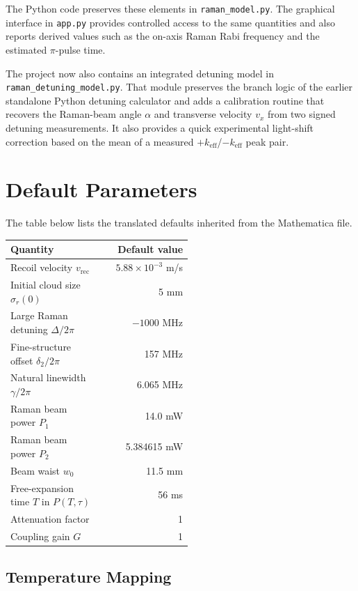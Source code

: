 \documentclass[11pt,a4paper]{article}
\begin{document}
The Python code preserves these elements in \texttt{raman\_model.py}. The graphical interface in
\texttt{app.py} provides controlled access to the same quantities and also reports derived values
such as the on-axis Raman Rabi frequency and the estimated $\pi$-pulse time.

The project now also contains an integrated detuning model in \texttt{raman\_detuning\_model.py}.
That module preserves the branch logic of the earlier standalone Python detuning calculator and
adds a calibration routine that recovers the Raman-beam angle $\alpha$ and transverse velocity
$v_x$ from two signed detuning measurements. It also provides a quick experimental light-shift
correction based on the mean of a measured $+k_{\mathrm{eff}}$/$-k_{\mathrm{eff}}$ peak pair.

\section{Default Parameters}

The table below lists the translated defaults inherited from the Mathematica file.

\begin{center}
\begin{tabular}{>{\raggedright\arraybackslash}p{0.52\linewidth}r}
\toprule
Quantity & Default value \\
\midrule
Recoil velocity $v_{\mathrm{rec}}$ & $5.88 \times 10^{-3}$ m/s \\
Initial cloud size $\sigma_r(0)$ & 5 mm \\
Large Raman detuning $\Delta / 2\pi$ & $-1000$ MHz \\
Fine-structure offset $\delta_2 / 2\pi$ & 157 MHz \\
Natural linewidth $\gamma / 2\pi$ & 6.065 MHz \\
Raman beam power $P_1$ & 14.0 mW \\
Raman beam power $P_2$ & 5.384615 mW \\
Beam waist $w_0$ & 11.5 mm \\
Free-expansion time $T$ in $P(T,\tau)$ & 56 ms \\
Attenuation factor & 1 \\
Coupling gain $G$ & 1 \\
\bottomrule
\end{tabular}
\end{center}

\subsection{Temperature Mapping}
\end{document}
